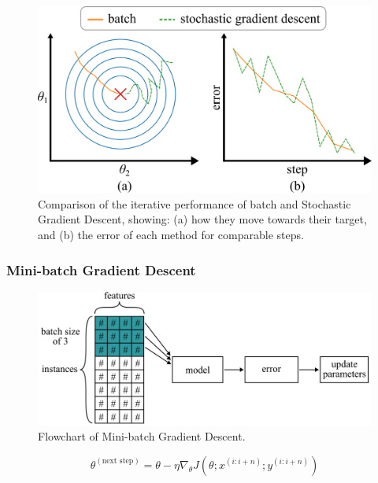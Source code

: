 \documentclass[12pt,letter]{article}
\begin{document}
\begin{figure}[H]
	\centering
	\includegraphics[]{../figures/stochastic_gradient_descent_target}
	\caption{Comparison of the iterative performance of  batch and Stochastic Gradient Descent, showing: (a) how they move towards their target, and (b) the error of each method for comparable steps.}
	\label{fig:stochastic_gradient_descent_target}
\end{figure}






\subsubsection{Mini-batch Gradient Descent}


\begin{figure}[H]
	\centering
	\includegraphics[width=5.4in]{../figures/gradient_descent_mini_batch}
	\caption{Flowchart of Mini-batch Gradient Descent.}
	\label{fig:gradient_descent_mini_batch}
\end{figure}


\begin{equation}
\theta^{(\text{next step})} = \theta - \eta \nabla_\theta J(\theta; x^{(i:i+n)}; y^{(i:i+n)})
\end{equation}
\end{document}
